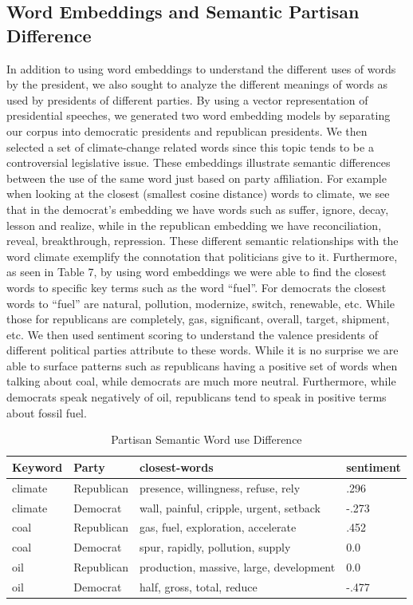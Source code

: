 \documentclass{article}
\begin{document}
{\subsection{Word Embeddings and Semantic Partisan Difference}{
In addition to using word embeddings to understand the different uses of words by the president, we also sought to analyze the different meanings of words as used by presidents of different parties. By using a vector representation of presidential speeches, we generated two word embedding models by separating our corpus into democratic presidents and republican presidents. We then selected a set of climate-change related words since this topic tends to be a controversial legislative issue. These embeddings illustrate semantic differences between the use of the same word just based on party affiliation. For example when looking at the closest (smallest cosine distance) words to climate, we see that in the democrat's embedding we have words such as suffer, ignore, decay, lesson and realize, while in the republican embedding we have reconciliation, reveal, breakthrough, repression. These different semantic relationships with the word climate exemplify the connotation that politicians give to it. 
Furthermore, as seen in Table 7, by using word embeddings we were able to find the closest words to specific key terms such as the word “fuel”.  For democrats the closest words to “fuel” are natural, pollution, modernize, switch, renewable, etc. While those for republicans are completely, gas, significant, overall, target, shipment, etc.
We then used sentiment scoring to understand the valence presidents of different political parties attribute to these words. While it is no surprise we are able to surface patterns such as republicans having a positive set of words when talking about coal, while democrats are much more neutral. Furthermore, while democrats speak negatively of oil, republicans tend to speak in positive terms about fossil fuel.

\begin{table}[H]
	\caption{Partisan Semantic Word use Difference}
	\centering
	\begin{tabular}{llll}
		\toprule
		\midrule
		Keyword  & Party & closest-words & sentiment\\
		\midrule
		\midrule
		climate & Republican & presence, willingness, refuse, rely  & .296  \\
		\midrule
		climate & Democrat & wall, painful, cripple, urgent, setback & -.273   \\
		\midrule
		coal & Republican & gas, fuel, exploration, accelerate & .452   \\
		\midrule
		coal & Democrat & spur, rapidly, pollution, supply & 0.0   \\
		\midrule 
		oil & Republican & production, massive, large, development & 0.0    \\
		\midrule
		oil & Democrat & half, gross, total, reduce & -.477   \\
		\bottomrule
	\end{tabular}
\end{table}}

}
\end{document}
